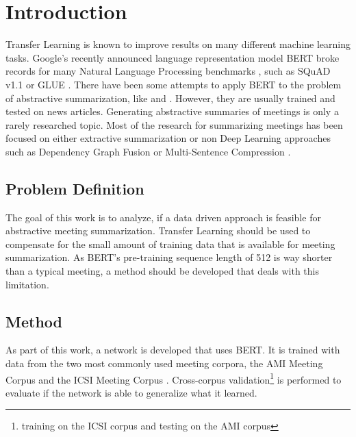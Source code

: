 \chapter{Introduction}\label{ch:Introduction}


Transfer Learning is known to improve results on many different machine learning tasks.
Google's recently announced language representation model BERT broke records for many Natural Language Processing benchmarks \cite[p.~5--7]{devlin2018bert}, such as  SQuAD v1.1 \cite{rajpurkar-etal-2016-squad} or GLUE \cite{1804.07461}.
There have been some attempts to apply BERT to the problem of abstractive summarization, like \cite{1902.09243} and \cite{1908.08345}.
However, they are usually trained and tested on news articles.
Generating abstractive summaries of meetings is only a rarely researched topic.
Most of the research for summarizing meetings has been focused on either extractive summarization or non Deep Learning approaches such as Dependency Graph Fusion \cite{1609.07035} or Multi-Sentence Compression \cite{shang-etal-2018-unsupervised}.


\section{Problem Definition}

The goal of this work is to analyze, if a data driven approach is feasible for abstractive meeting summarization.
Transfer Learning should be used to compensate for the small amount of training data that is available for meeting summarization.
As BERT's pre-training sequence length of 512 \cite[p.~13]{devlin2018bert} is way shorter than a typical meeting, a method should be developed that deals with this limitation.


\section{Method}

As part of this work, a network is developed that uses BERT.
It is trained with data from the two most commonly used meeting corpora, the AMI Meeting Corpus \cite{Mccowan05theami} and the ICSI Meeting Corpus \cite{Janin}.
Cross-corpus validation\footnote{\Eg training on the ICSI corpus and testing on the AMI corpus} is performed to evaluate if the network is able to generalize what it learned.

